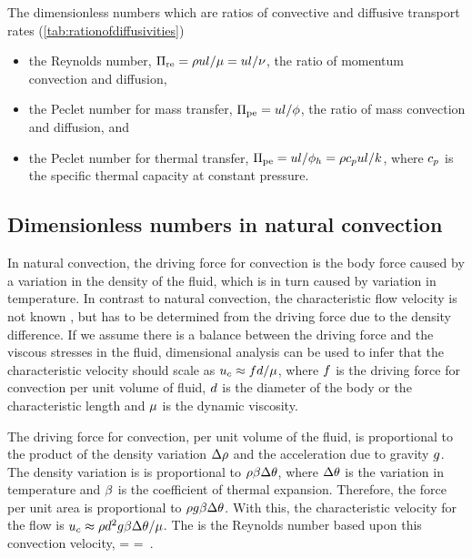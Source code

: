 The dimensionless numbers which are ratios of convective and diffusive transport rates (\autoref{tab:rationofdiffusivities}) 
%
\begin{itemize}
\item the Reynolds number, $\Pi_\text{re} = \rho ul/\mu = ul/\nu$, the ratio of momentum convection and diffusion,

\item the Peclet number for mass transfer, $\Pi_\text{pe} = ul/\phi$, the ratio of mass convection and diffusion, and

\item the Peclet number for thermal transfer, $\Pi_\text{pe} = ul/\phi_h = \rho c_pul/k$, where $c_p$ is the specific thermal capacity at constant pressure.
\end{itemize}


\subsection{Dimensionless numbers in natural convection}
In natural convection, the driving force for convection is the body force caused by a variation in the density of the fluid, which is in turn caused by variation in temperature. In contrast to natural convection, the characteristic flow velocity is not known \apriori, but has to be determined from the driving force due to the density difference. If we assume there is a balance between the driving force and the viscous stresses in the fluid, dimensional analysis can be used to infer that the characteristic velocity should scale as ${u}_{c}\approx fd/\mu$, where $f$ is the driving force for convection per unit volume of fluid, $d$ is the diameter of the body or the characteristic length and $\mu$ is the dynamic viscosity.

The driving force for convection, per unit volume of the fluid, is proportional to the product of the density variation $\Delta\rho$ and the acceleration due to gravity $g$. The density variation is is proportional to $\rho\beta\Delta\theta$, where $\Delta\theta$ is the variation in temperature and $\beta$ is the coefficient of thermal expansion. Therefore, the force per unit area is proportional to $\rho g\beta\Delta\theta$. With this, the characteristic velocity for the flow is ${u}_{c}\approx\rho d^2g\beta\Delta\theta/\mu$. The  is the Reynolds number based upon this convection velocity,
\beq
\kgrashof = \dfrac{\dens\chpq\vel\diam}{\dynvis} 
          = \,.
\eeq

